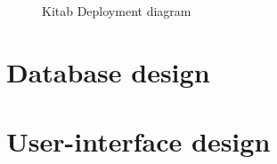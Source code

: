 		\begin{figure}[H]
		\begin{center}

		\caption{Kitab Deployment diagram}
		\label{dia_mvc_dplymnt}

		\end{center}
		\end{figure}

\section{Database design}

\section{User-interface design}